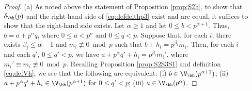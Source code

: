 \documentclass[12pt, reqno, twoside, letterpaper]{amsart}
\begin{document}
\begin{proof}
%
(a)
%
As noted above the statement of Proposition \ref{prop:S2h}, to 
show that $\delta_{\bh}(p)$ and the right-hand side of 
\eqref{eq:defdelthp3} exist and are equal, it suffices to show 
that the right-hand side exists.
%
Let $\alpha \ge 1$ and let $0 \le b < p^{\alpha + 1}$.
%
Thus, $b = a + p^{\alpha}q$, where $0 \le a < p^{\alpha}$ and 
$0 \le q < p$.
%
Suppose that, for each $i$, there exists $\beta_i \le \alpha - 1$ 
and $m_i \not\equiv 0 \bmod p$ such that 
$b + h_i = p^{\beta_i}m_i$.
%
Then, for each $i$ and each $q'$, $0 \le q' < p$, we have 
$a + p^{\alpha}q' + h_i = p^{\beta_i}m_i'$, where 
$m_i' \equiv m_i \not\equiv 0 \bmod p$.
%
Recalling Proposition \ref{prop:S2S3S1} and definition 
\eqref{eq:defVh}, we see that the following are equivalent: 
(i) $b \in \V_{\bh}(p^{\alpha + 1})$; 
(ii) $a + p^{\alpha}q' + h_i \in \V_{\bh}(p^{\alpha + 1})$ for 
$0 \le q' < p$;
(iii) $a \in \V_{\bh}(p^{\alpha})$.


\end{proof}
\end{document}
